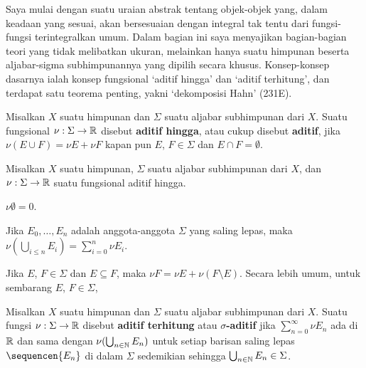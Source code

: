       
\def\chaptername{Teorema Radon-Nikod\'ym} 
\def\sectionname{Fungsional aditif terhitung} 
      
      
Saya mulai dengan suatu uraian abstrak tentang objek-objek yang, dalam 
keadaan yang sesuai, akan bersesuaian dengan integral tak tentu dari 
fungsi-fungsi terintegralkan umum. Dalam bagian ini saya menyajikan 
bagian-bagian teori yang tidak melibatkan ukuran, melainkan hanya suatu 
himpunan beserta aljabar-sigma subhimpunannya yang dipilih secara khusus. 
Konsep-konsep dasarnya ialah konsep fungsional `aditif hingga' dan `aditif 
terhitung', dan terdapat satu teorema penting, yakni `dekomposisi Hahn' (231E). 
      
 Misalkan $X$ suatu himpunan dan $\Sigma$ suatu 
aljabar subhimpunan dari $X$.   Suatu fungsional 
$\nu:\Sigma\to\Bbb R$ disebut {\bf aditif hingga}, atau cukup disebut 
{\bf aditif}, jika $\nu(E\cup F)=\nu E+\nu F$ kapan pun $E$, 
$F\in\Sigma$ dan $E\cap F=\emptyset$. 
      
 Misalkan $X$ suatu himpunan, $\Sigma$ suatu 
aljabar subhimpunan dari $X$, dan $\nu:\Sigma\to\Bbb R$ suatu fungsional 
aditif hingga. 
      
 $\nu\emptyset=0$.    
      
 Jika $E_0,\ldots,E_n$ adalah anggota-anggota 
$\Sigma$ yang saling lepas, maka 
$\nu(\bigcup_{i\le n}E_i)=\sum_{i=0}^n\nu E_i$. 
      
 Jika $E$, $F\in\Sigma$ dan $E\subseteq F$, maka 
$\nu F=\nu E + \nu(F\setminus E)$.   Secara lebih umum, untuk sembarang 
$E$, $F\in\Sigma$, 
      


      
 Misalkan $X$ suatu himpunan dan $\Sigma$ suatu 
aljabar subhimpunan dari $X$.   Suatu fungsi 
$\nu:\Sigma\to\Bbb R$ disebut {\bf aditif terhitung} atau 
{\bf $\sigma$-aditif} jika $\sum_{n=0}^{\infty}\nu E_n$ ada di $\Bbb 
R$ dan sama dengan $\nu(\bigcup_{n\in\Bbb N}E_n)$ untuk setiap 
barisan saling lepas $\sequencen{E_n}$ di dalam $\Sigma$ sedemikian sehingga 
$\bigcup_{n\in\Bbb N}E_n\in\Sigma$. 
      
